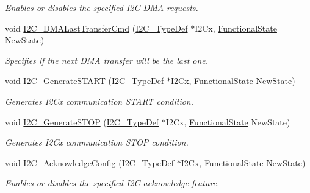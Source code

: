 \begin{DoxyCompactItemize}
\begin{DoxyCompactList}\small\item\em Enables or disables the specified I2C D\+MA requests. \end{DoxyCompactList}\item 
void \hyperlink{group___i2_c___exported___functions_gab2e994c5681eb6ec7c26a03ffe1de060}{I2\+C\+\_\+\+D\+M\+A\+Last\+Transfer\+Cmd} (\hyperlink{struct_i2_c___type_def}{I2\+C\+\_\+\+Type\+Def} $\ast$I2\+Cx, \hyperlink{group___exported__types_gac9a7e9a35d2513ec15c3b537aaa4fba1}{Functional\+State} New\+State)
\begin{DoxyCompactList}\small\item\em Specifies if the next D\+MA transfer will be the last one. \end{DoxyCompactList}\item 
void \hyperlink{group___i2_c___exported___functions_ga36c522b471588be9779c878222ccb20f}{I2\+C\+\_\+\+Generate\+S\+T\+A\+RT} (\hyperlink{struct_i2_c___type_def}{I2\+C\+\_\+\+Type\+Def} $\ast$I2\+Cx, \hyperlink{group___exported__types_gac9a7e9a35d2513ec15c3b537aaa4fba1}{Functional\+State} New\+State)
\begin{DoxyCompactList}\small\item\em Generates I2\+Cx communication S\+T\+A\+RT condition. \end{DoxyCompactList}\item 
void \hyperlink{group___i2_c___exported___functions_ga5c92cb573ca0ae58cc465e5400246561}{I2\+C\+\_\+\+Generate\+S\+T\+OP} (\hyperlink{struct_i2_c___type_def}{I2\+C\+\_\+\+Type\+Def} $\ast$I2\+Cx, \hyperlink{group___exported__types_gac9a7e9a35d2513ec15c3b537aaa4fba1}{Functional\+State} New\+State)
\begin{DoxyCompactList}\small\item\em Generates I2\+Cx communication S\+T\+OP condition. \end{DoxyCompactList}\item 
void \hyperlink{group___i2_c___exported___functions_ga7bb44e894d68a7991f564c43fb187486}{I2\+C\+\_\+\+Acknowledge\+Config} (\hyperlink{struct_i2_c___type_def}{I2\+C\+\_\+\+Type\+Def} $\ast$I2\+Cx, \hyperlink{group___exported__types_gac9a7e9a35d2513ec15c3b537aaa4fba1}{Functional\+State} New\+State)
\begin{DoxyCompactList}\small\item\em Enables or disables the specified I2C acknowledge feature. \end{DoxyCompactList}\item 

\end{DoxyCompactItemize}
